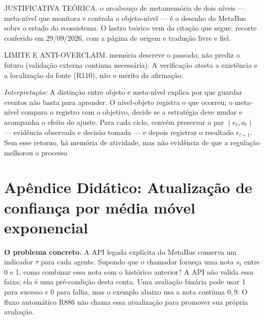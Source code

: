 \begin{descricao}
JUSTIFICATIVA TEÓRICA. o arcabouço de metamemória de dois níveis — meta-nível que monitora e controla o objeto-nível — é o desenho do MetaBus sobre o estado do ecossistema. O lastro teórico vem da citação que segue: recorte conferido em 29/09/2026, com a página de origem e tradução livre e fiel.
\end{descricao}

\begin{aviso}
LIMITE E ANTI-OVERCLAIM. memória descreve o passado; não prediz o futuro (validação externa continua necessária). A verificação atesta a existência e a
localização da fonte (R110), não o mérito da afirmação.
\end{aviso}

\noindent\textit{Interpretação:} A distinção entre objeto e meta-nível explica por que guardar eventos não basta para aprender. O nível-objeto registra o que ocorreu; o meta-nível compara o registro com o objetivo, decide se a estratégia deve mudar e acompanha o efeito do ajuste. Para cada ciclo, convém preservar o par $(e_t,a_t)$ — evidência observada e decisão tomada — e depois registrar o resultado $e_{t+1}$. Sem esse retorno, há memória de atividade, mas não evidência de que a regulação melhorou o processo 

\clearpage
\section{Apêndice Didático: Atualização de confiança por média móvel exponencial}


\begin{descricao}
\textbf{O problema concreto.} A API legada explícita do MetaBus conserva um
indicador $\tau$ para cada agente. Supondo que o chamador forneça uma nota $s_t$
entre 0 e 1, como combinar essa nota com o histórico anterior? A API não
valida essa faixa; ela é uma pré-condição desta conta. Uma avaliação
binária pode usar 1 para sucesso e 0 para falha, mas o exemplo abaixo usa a
nota contínua $0{,}9$. O fluxo automático R886 não chama essa atualização para
promover sua própria avaliação.
\end{descricao}

